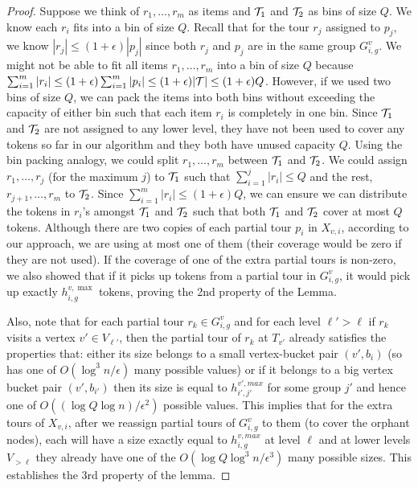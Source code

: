 \documentclass[twoside,leqno]{article}
\newcommand{\calT}{{\cal T}}
\newcommand{\eps}{\epsilon}
\begin{document}
\begin{proof}
Suppose we think of $r_1, \ldots, r_m$ as items and $\calT_1$ and $\calT_2$ as bins of size $Q$. We know each $r_i$ fits into a bin of size $Q$. Recall that for the tour $r_j$ assigned to $p_j$, we know $|r_j| \le (1 + \eps)|p_j|$ since both $r_j$ and $p_j$ are in the same group  $G^v_{i,g}$. We might not be able to fit all items $r_1, \ldots, r_m$ into a bin of size $Q$ because $\sum_{i = 1}^m|r_i| \le (1 + \eps)\sum_{i = 1}^m |p_i| \le (1 + \eps)|\calT| \le (1 + \eps)Q$. However, if we used two bins of size $Q$, we can pack the items into both bins without exceeding the capacity of either bin such that each item $r_i$ is completely in one bin. Since $\calT_1$ and $\calT_2$ are not assigned to any lower level, they have not been used to cover any tokens so far in our algorithm and they both have unused capacity $Q$. Using the bin packing analogy, we could split $r_1, \ldots, r_m$ between $\calT_1$ and $\calT_2$. We could assign $r_1, \ldots, r_j$ (for the maximum $j$) to $\calT_1$ such that $\sum_{i = 1}^j |r_i| \le Q$ and the rest, $r_{j+1}, \ldots, r_m$ to $\calT_2$. Since $\sum_{i = 1}^m |r_i| \le (1 + \eps)Q$, we can ensure we can distribute the tokens in $r_i$'s amongst $\calT_1$ and $\calT_2$ such that both $\calT_1$ and $\calT_2$ cover at most $Q$ tokens. Although there are two copies of each partial tour $p_i$ in $X_{v,i}$, according to our approach, we are using at most one of them (their coverage would be zero if they are not used). If the coverage of one of the extra partial tours is non-zero, we also showed that if it picks up tokens from a partial tour in $G^v_{i,g}$, it would pick up exactly $h^{v,\max}_{i,g}$ tokens, proving the 2nd property of the  Lemma.

Also, note that for each partial tour $r_k\in G^v_{i,g}$ and for each level $\ell'>\ell$ if $r_k$ visits a vertex $v'\in V_{\ell'}$,
then the partial tour of $r_k$ at $T_{v'}$ already satisfies the properties that: either its size belongs to a small vertex-bucket
pair $(v',b_i)$ (so has one of $O(\log^3 n/\eps)$ many possible values) or if it belongs to a big
vertex bucket pair $(v',b_{i'})$ then its size is equal to $h^{v',max}_{i',j'}$ for some group $j'$ and hence one of
$O((\log Q\log n)/\eps^2)$ possible values.
This implies that for the extra tours of $X_{v,i}$, after we reassign partial
tours of $G^v_{i,g}$ to them (to cover the orphant nodes), each will have a size exactly equal to $h^{v,max}_{i,g}$ at level $\ell$
and at lower levels $V_{>\ell}$ they already have one of the $O(\log Q\log^3 n/\eps^3)$ many possible sizes. This establishes the 3rd property of the lemma.
\end{proof}
\end{document}
